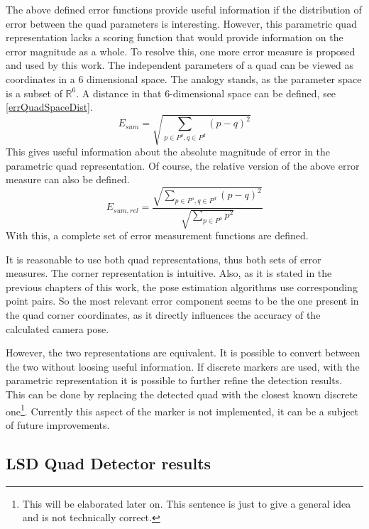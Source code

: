 The above defined error functions provide useful information if the distribution of error between the quad parameters is interesting.
However, this parametric quad representation lacks a scoring function that would provide information on the error magnitude as a whole.
To resolve this, one more error measure is proposed and used by this work.
The independent parameters of a quad can be viewed as coordinates in a 6 dimensional space.
The analogy stands, as the parameter space is a subset of $\mathbb{R}^6$.
A distance in that 6-dimensional space can be defined, see \eqref{errQuadSpaceDist}.
\begin{equation}
E_{sum} = \sqrt{\sum_{p \in P^o, q \in P^d} (p - q)^2}
\label{eq:errQuadSpaceDist}
\end{equation}
This gives useful information about the absolute magnitude of error in the parametric quad representation.
Of course, the relative version of the above error measure can also be defined.
\begin{equation}
E_{sum, rel} = \frac{\sqrt{\sum_{p \in P^o, q \in P^d} (p - q)^2}}{\sqrt{\sum_{p \in P^o} p^2}}
\label{eq:errQuadSpaceDistRel}
\end{equation}
With this, a complete set of error measurement functions are defined.

It is reasonable to use both quad representations, thus both sets of error measures.
The corner representation is intuitive.
Also, as it is stated in the previous chapters of this work, the pose estimation algorithms use corresponding point pairs.
So the most relevant error component seems to be the one present in the quad corner coordinates, as it directly influences the accuracy of the calculated camera pose.

However, the two representations are equivalent.
It is possible to convert between the two without loosing useful information.
If discrete markers are used, with the parametric representation it is possible to further refine the detection results.
This can be done by replacing the detected quad with the closest known discrete one\footnote{This will be elaborated later on. This sentence is just to give a general idea and is not technically correct.}.
Currently this aspect of the marker is not implemented, it can be a subject of future improvements.

\subsection{LSD Quad Detector results}

